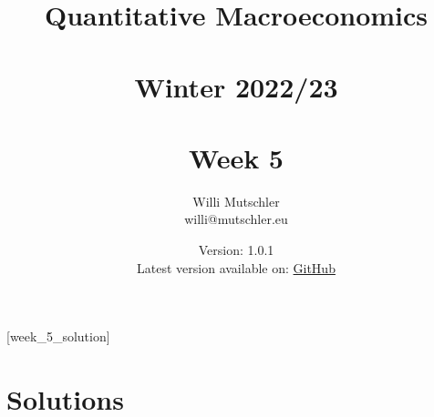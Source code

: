 
\newif\ifDisplaySolutions\DisplaySolutionstrue


\title{Quantitative Macroeconomics\\~\\Winter 2022/23\\~\\Week 5}
\author{Willi Mutschler\\willi@mutschler.eu}
\date{Version: 1.0.1\\Latest version available on: \href{https://github.com/wmutschl/Quantitative-Macroeconomics/releases/latest/download/week_5.pdf}{GitHub}}
\maketitle\thispagestyle{empty}

\newpage
{}[week_5_solution]
\tableofcontents\thispagestyle{empty}\newpage

\setcounter{page}{1}
\newpage
\newpage
\newpage
\printbibliography
\newpage

\ifDisplaySolutions
\newpage
\appendix
\section{Solutions}

\fi
